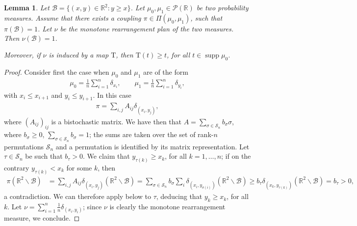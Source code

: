 \documentclass[12pt,a4paper]{amsart}
\theoremstyle{plain}
\newtheorem{lemma}{Lemma}[section]
\theoremstyle{definition}
\numberwithin{equation}{section}
\newcommand{\R}{\mathbb{R}}
\DeclareMathOperator{\supp}{supp}
\newcommand{\Prob}{\mathcal P}
\begin{document}
\begin{lemma}
  \label{lem:monotone}
  Let ${\mathcal B}=\{(x,y)\in\R^2: y\geq x\}$.
  Let $\mu_0,\mu_1\in \Prob(\R)$ be two probability measures.
  Assume that there exists a coupling $\pi\in\Pi(\mu_0,\mu_1)$, such
  that $\pi(\mathcal{B})=1$.
  Let $\nu$ be the monotone rearrangement plan of the two measures.
  Then $\nu(\mathcal{B})=1$.

  Moreover, if $\nu$ is induced by a map $\mathrm{T}$, then
  $\mathrm{T}(t)\geq t$, for all $t\in\supp\mu_0$.
\end{lemma}
\begin{proof}
Consider first the case when $\mu_0$ and $\mu_1$ are of the form
\begin{align}
    \mu_0
    =
    \frac{1}{n}
    \sum_{i=1}^{n}
    \delta_{x_i}
    ,
    \qquad
        \mu_1
    =
    \frac{1}{n}
    \sum_{i=1}^{n}
    \delta_{y_i}
    ,
\end{align} 
with $x_i\leq x_{i+1}$ and $y_i\leq y_{i+1}$.
%
In this case 
\begin{align}
    \pi=
    \sum_{i,j}
    A_{ij}
    \delta_{(x_i,y_j)}
    ,
\end{align}
where $(A_{ij})_{ij}$ is a bistochastic matrix.
%
We have then that $A=\sum_{\sigma\in \mathcal{S}_n} b_\sigma \sigma$,
where $b_\sigma\geq 0$, $\sum_{\sigma\in \mathcal{S}_n} b_\sigma=1$;
the sums are taken over the set of rank-$n$ permutations $\mathcal{S}_n$
and a permutation is identified by its matrix representation.
%
Let $\tau\in \mathcal{S}_n$ be such that $b_\tau>0$.
%
We claim that $y_{\tau(k)}\geq x_{k}$, for all $k = 1, \dots, n$; 
if on the contrary $y_{\tau(k)}< x_{k}$ for some $k$, then
\begin{align*}
    \pi(\R^2\backslash \mathcal{B})
    &
    =
    \sum_{i,j} A_{ij}\delta_{(x_i,y_j)}(\R^2\backslash \mathcal{B})
    =
    \sum_{\sigma\in \mathcal{S}_n} b_\sigma
    \sum_{i} \delta_{(x_i,y_{\sigma(i)})} (\R^2\backslash \mathcal{B})
    \geq b_\tau \delta_{(x_k,y_{\tau(k)})}  (\R^2\backslash \mathcal{B})
    = b_\tau>0,
\end{align*}
a contradiction.
%
We can therefore apply   below to 
$\tau$, deducing that 
$y_k\geq x_k$, for all $k$.
%
Let $\nu=\sum_{i=1}^{n} \frac{1}{n}\delta_{(x_i,y_i)}$; 
since $\nu$ is clearly the monotone rearrangement measure, we conclude.


\end{proof}
\end{document}
